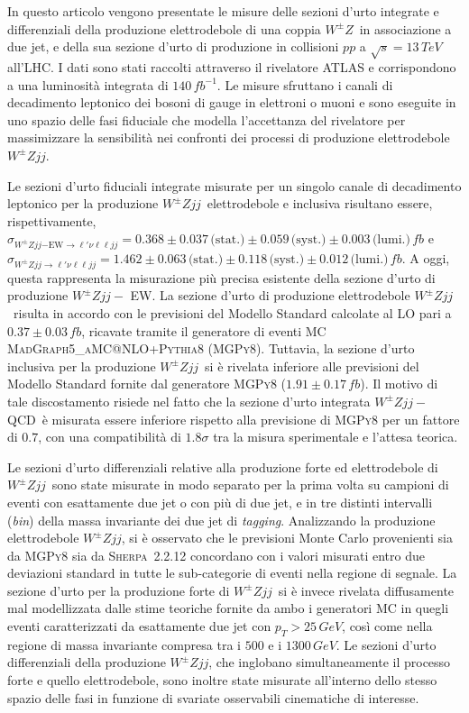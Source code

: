 \documentclass[11pt]{article}
\newcommand{\wzjjew}{$W^\pm Z jj-$ EW}
\newcommand{\wzjjqcd}{$W^\pm Z jj-$ QCD}
\newcommand{\wzjj}{$W^\pm Z jj$}
\newcommand{\wz}{$W^\pm Z$}
\begin{document}
In questo articolo vengono presentate le misure delle sezioni d'urto integrate e differenziali della produzione elettrodebole di una coppia \wz\ in associazione a due jet, e della sua sezione d'urto di produzione in collisioni $pp$ a $\sqrt{s} = 13\,\unit{TeV}$ all'LHC. I dati sono stati raccolti attraverso il rivelatore ATLAS e corrispondono a una luminosità integrata di $140\,\unit{fb}^{-1}$. Le misure sfruttano i canali di decadimento leptonico dei bosoni di gauge in elettroni o muoni e sono eseguite in uno spazio delle fasi fiduciale che modella l'accettanza del rivelatore per massimizzare la sensibilità nei confronti dei processi di produzione elettrodebole \wzjj.

Le sezioni d'urto fiduciali integrate misurate per un singolo canale di decadimento leptonico per la produzione \wzjj\ elettrodebole e inclusiva risultano essere, rispettivamente, $\sigma_{W^\pm Zjj\mathrm{-EW} \rightarrow \ell' \nu \ell \ell jj} = 0.368 \pm 0.037\,\text{(stat.)} \pm 0.059\,\text{(syst.)} \pm 0.003\,\text{(lumi.)}\,\unit{fb}$ e $\sigma_{W^\pm Zjj \rightarrow \ell' \nu \ell \ell jj} = 1.462 \pm 0.063\,\text{(stat.)} \pm 0.118\,\text{(syst.)} \pm 0.012\,\text{(lumi.)}\,\unit{fb}$. A oggi, questa rappresenta la misurazione più precisa esistente della sezione d'urto di produzione \wzjjew. La sezione d'urto di produzione elettrodebole \wzjj\ risulta in accordo con le previsioni del Modello Standard calcolate al LO pari a $0.37 \pm 0.03\,\unit{fb}$, ricavate tramite il generatore di eventi MC \textsc{MadGraph5\_aMC@NLO}+\textsc{Pythia8} (\textsc{MGPy8}). Tuttavia, la sezione d'urto inclusiva per la produzione \wzjj\ si è rivelata inferiore alle previsioni del Modello Standard fornite dal generatore \textsc{MGPy8} ($1.91 \pm 0.17\,\unit{fb}$). Il motivo di tale discostamento risiede nel fatto che la sezione d'urto integrata \wzjjqcd\ è misurata essere inferiore rispetto alla previsione di \textsc{MGPy8} per un fattore di $0.7$, con una compatibilità di $1.8\sigma$ tra la misura sperimentale e l'attesa teorica.

Le sezioni d'urto differenziali relative alla produzione forte ed elettrodebole di \wzjj\ sono state misurate in modo separato per la prima volta su campioni di eventi con esattamente due jet o con più di due jet, e in tre distinti intervalli (\textit{bin}) della massa invariante dei due jet di \textit{tagging}. Analizzando la produzione elettrodebole \wzjj, si è osservato che le previsioni Monte Carlo provenienti sia da \textsc{MGPy8} sia da \textsc{Sherpa}~2.2.12 concordano con i valori misurati entro due deviazioni standard in tutte le sub-categorie di eventi nella regione di segnale. La sezione d'urto per la produzione forte di \wzjj\ si è invece rivelata diffusamente mal modellizzata dalle stime teoriche fornite da ambo i generatori MC in quegli eventi caratterizzati da esattamente due jet con $p_T > 25\,\unit{GeV}$, così come nella regione di massa invariante compresa tra i $500$ e i $1300\,\unit{GeV}$. Le sezioni d'urto differenziali della produzione \wzjj, che inglobano simultaneamente il processo forte e quello elettrodebole, sono inoltre state misurate all'interno dello stesso spazio delle fasi in funzione di svariate osservabili cinematiche di interesse.
\end{document}
